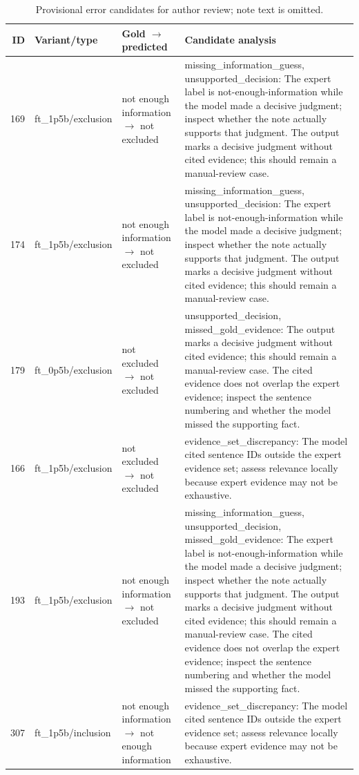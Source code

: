 \begin{table}[t]
\centering
\scriptsize
\caption{Provisional error candidates for author review; note text is omitted.}
\label{tab:error-cases}
\begin{tabularx}{\textwidth}{rllX}
\toprule
ID & Variant/type & Gold $\rightarrow$ predicted & Candidate analysis \\
\midrule
169 & ft\_1p5b/exclusion & not enough information $\rightarrow$ not excluded & missing\_information\_guess, unsupported\_decision: The expert label is not-enough-information while the model made a decisive judgment; inspect whether the note actually supports that judgment. The output marks a decisive judgment without cited evidence; this should remain a manual-review case. \\
174 & ft\_1p5b/exclusion & not enough information $\rightarrow$ not excluded & missing\_information\_guess, unsupported\_decision: The expert label is not-enough-information while the model made a decisive judgment; inspect whether the note actually supports that judgment. The output marks a decisive judgment without cited evidence; this should remain a manual-review case. \\
179 & ft\_0p5b/exclusion & not excluded $\rightarrow$ not excluded & unsupported\_decision, missed\_gold\_evidence: The output marks a decisive judgment without cited evidence; this should remain a manual-review case. The cited evidence does not overlap the expert evidence; inspect the sentence numbering and whether the model missed the supporting fact. \\
166 & ft\_1p5b/exclusion & not excluded $\rightarrow$ not excluded & evidence\_set\_discrepancy: The model cited sentence IDs outside the expert evidence set; assess relevance locally because expert evidence may not be exhaustive. \\
193 & ft\_1p5b/exclusion & not enough information $\rightarrow$ not excluded & missing\_information\_guess, unsupported\_decision, missed\_gold\_evidence: The expert label is not-enough-information while the model made a decisive judgment; inspect whether the note actually supports that judgment. The output marks a decisive judgment without cited evidence; this should remain a manual-review case. The cited evidence does not overlap the expert evidence; inspect the sentence numbering and whether the model missed the supporting fact. \\
307 & ft\_1p5b/inclusion & not enough information $\rightarrow$ not enough information & evidence\_set\_discrepancy: The model cited sentence IDs outside the expert evidence set; assess relevance locally because expert evidence may not be exhaustive. \\

\end{tabularx}
\end{table}
